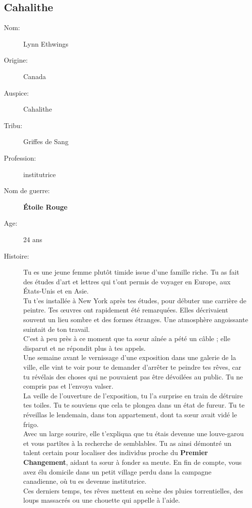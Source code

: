 \documentclass[oneside,12pt]{book}
\newcommand{\Lynn}{\textbf{Étoile Rouge} }
\begin{document}
\begin{flushleft}
\section{Cahalithe}
\begin{description}
\item[Nom:]{Lynn Ethwings}
\item[Origine:]{Canada}
\item[Auspice:]{Cahalithe}
\item[Tribu:]{Griffes de Sang}
\item[Profession:]{institutrice}
\item[Nom de guerre:]{\Lynn}
\item[Age:]{24 ans}
\item[Histoire:]{ 
Tu es une jeune femme plutôt timide issue d’une famille riche. Tu as fait des études d’art et lettres qui t’ont permis de voyager en Europe, aux États-Unis et en Asie.\\
Tu t’es installée à New York après tes études, pour débuter une carrière de peintre. Tes œuvres ont rapidement été remarquées. Elles décrivaient souvent un lieu sombre et des formes étranges. Une atmosphère angoissante suintait de ton travail.\\
C’est à peu près à ce moment que ta sœur aînée a pété un câble ; elle disparut et ne répondit plus à tes appels.\\
Une semaine avant le vernissage d’une exposition dans une galerie de la ville, elle vint te voir pour te demander d’arrêter te peindre tes rêves, car tu révélais des choses qui ne pouvaient pas être dévoilées au public. Tu ne compris pas et l’envoya valser.\\
La veille de l’ouverture de l’exposition, tu l'a surprise en train de détruire tes toiles. Tu te souviens que cela te plongea dans un état de fureur. Tu te réveillas le lendemain, dans ton appartement, dont ta sœur avait vidé le frigo.\\
Avec un large sourire, elle t’expliqua que tu étais devenue une louve-garou et vous partîtes à la recherche de semblables. Tu as ainsi démontré un talent certain pour localiser des individus proche du \textbf{Premier Changement}, aidant ta sœur à fonder sa meute. En fin de compte, vous avez élu domicile dans un petit village perdu dans la campagne canadienne, où tu es devenue institutrice.\\
Ces derniers temps, tes rêves mettent en scène des pluies torrentielles, des loups massacrés ou une chouette qui appelle à l’aide.\\
}
\end{description}
\end{flushleft}
\end{document}
